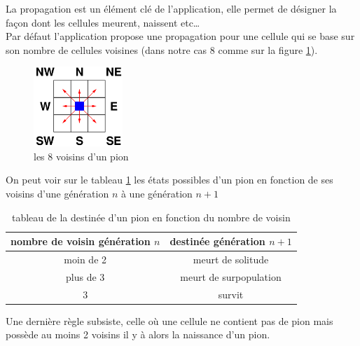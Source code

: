 \documentclass[pdftex,12pt,a4paper]{article}
\begin{document}
     	La propagation est un élément clé de l'application, elle permet de désigner la façon dont les cellules meurent, naissent etc\dots \\
    	Par défaut l'application propose une propagation pour une cellule  qui se base sur son nombre de cellules voisines (dans notre cas 8 comme sur la figure \ref{fig:voisinPion}).
        

	   
      	\begin{figure}[htb]
        	\begin{center}
        	\includegraphics[width=0.3\textwidth]{./images/cells-voisines.png}\caption{\label{fig:voisinPion}les 8 voisins d'un pion}
             \end{center}
      	\end{figure}
      	
      	\FloatBarrier

   On peut voir sur le tableau \ref{tab:etatPion} les états possibles d'un pion en fonction de ses voisins d'une génération $n$ à une génération $n+1$ 
       
        
       \begin{table}[htb]
         \begin{center}
  			\begin{tabular}{  | c | c | }
    		\hline
     		\rowcolor{blue!20}\textbf{nombre de voisin génération $n$} & \textbf{destinée génération $n+1$} \\   
         	 \hline
     		  moin de 2 & meurt de solitude   \\ 
        	 \hline
     		  plus de 3 & meurt de surpopulation  \\
	 	     \hline
          	  3	& survit \\
          	 \hline
   			\end{tabular}      
            \caption{\label{tab:etatPion}tableau de la destinée d'un pion en fonction du nombre de voisin}
           \end{center}
        \end{table}
        
 		Une dernière règle subsiste, celle où une cellule ne contient pas de pion mais possède au moins 2 voisins il y à alors la naissance d'un pion.
\end{document}
